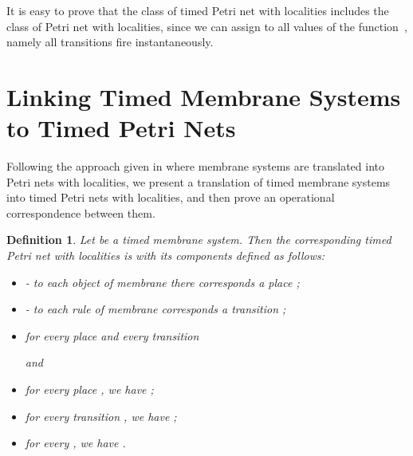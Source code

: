 \documentclass{eptcs}
\newtheorem{definition}{Definition}
\begin{document}
It is easy to prove that the class of timed Petri net with
localities includes the class of Petri net with localities, since we
can assign  to all values of the function~, namely all
transitions fire instantaneously.

\section{Linking Timed Membrane Systems to Timed Petri Nets}
\label{subsection:relationship}

Following the approach given in \cite{Kleijn06} where membrane systems are
translated into Petri nets with localities, we present a translation of timed
membrane systems into timed Petri nets with localities, and then prove an
operational correspondence between them.

\begin{definition}
\label{definition:translation} Let
 be a timed membrane
system. Then the corresponding timed Petri net with localities is
 with its components defined as
follows:

\begin{itemize}
\item  - to each object  of
membrane  there corresponds a place ;

\item  - to
each rule  of membrane  corresponds a transition ;

\item for every place  and every transition 

 and


\item for every place , we have ;
\item for every transition , we have ;
\item for every , we have .
\end{itemize}
\end{definition}
\end{document}
